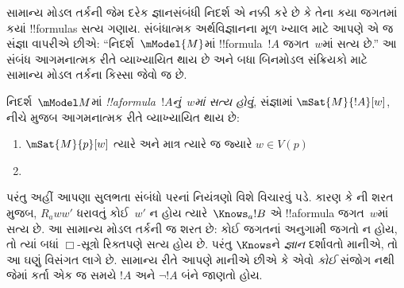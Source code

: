 \documentclass[../../../include/open-logic-section]{subfiles}
\begin{document}


સામાન્ય મોડલ તર્કની જેમ દરેક જ્ઞાનસંબંધી નિદર્શ એ નક્કી કરે છે કે
તેના કયા જગતમાં કયાં !!{formula}s સત્ય ગણાય. સંબંધાત્મક
અર્થવિજ્ઞાનના મૂળ ખ્યાલ માટે આપણે એ જ સંજ્ઞા વાપરીએ છીએ:
``નિદર્શ~$\mModel{M}$માં !!{formula}~$!A$ જગત~$w$માં સત્ય છે.''
આ સંબંધ આગમનાત્મક રીતે વ્યાખ્યાયિત થાય છે અને બધા બિનમોડલ
સંક્રિયકો માટે સામાન્ય મોડલ તર્કના કિસ્સા જેવો જ છે.

\begin{defn}
  નિદર્શ~$\mModel M$માં \emph{!!a{formula}~$!A$નું~$w$માં સત્ય હોવું},
  સંજ્ઞામાં $\mSat{M}{!A}[w]$, નીચે મુજબ આગમનાત્મક રીતે
  વ્યાખ્યાયિત થાય છે:
  \begin{enumerate}
  \item $\mSat{M}{p}[w]$ ત્યારે અને માત્ર ત્યારે જ જ્યારે $w \in V(p)$
  \item{}
  \end{enumerate} 
\end{defn}

પરંતુ અહીં આપણા સુલભતા સંબંધો પરનાં નિયંત્રણો વિશે વિચારવું પડે.
કારણ કે ની શરત મુજબ, $R_a ww'$
ધરાવતું કોઈ~$w'$ ન હોય ત્યારે~$\Knows_a !B$ એ !!a{formula}
જગત~$w$માં સત્ય છે. આ સામાન્ય મોડલ તર્કની જ શરત છે: કોઈ
જગતનાં અનુગામી જગતો ન હોય, તો ત્યાં બધાં $\Box$-સૂત્રો
રિક્તપણે સત્ય હોય છે. પરંતુ $\Knows$ને \emph{જ્ઞાન} દર્શાવતો
માનીએ, તો આ ઘણું વિસંગત લાગે છે. સામાન્ય રીતે આપણે માનીએ છીએ
કે એવો \emph{કોઈ} સંજોગ નથી જેમાં કર્તા એક જ સમયે $!A$ અને
$\lnot !A$ બંને જાણતો હોય.
\end{document}
